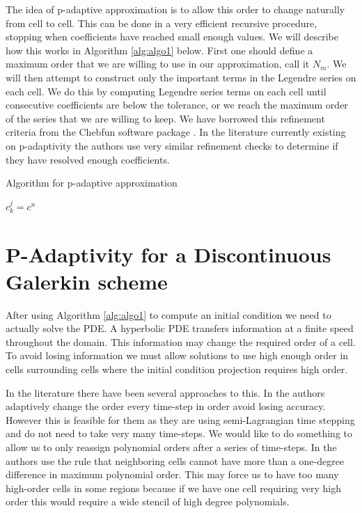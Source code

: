 \documentclass[10]{amsart}
\begin{document}
The idea of p-adaptive approximation is to allow this order to change naturally from cell to cell. This can be done in a 
very efficient recursive procedure, stopping when coefficients have reached small enough values. 
We will describe how this works in Algorithm \ref{alg:algo1} below.
First one should define a maximum order that we are willing to use in our approximation, call it $N_m$. We will
then attempt to construct only the important terms in the Legendre series on each cell. We do this by computing Legendre
series terms on each cell until consecutive coefficients are below the tolerance, or we reach the maximum order
of the series that we are willing to keep. We have borrowed this refinement criteria from the Chebfun software package
\cite{trefethen2013approximation}.
In the literature currently existing on p-adaptivity\cite{tumolo2013semi,eskilsson2011hp} the authors use very similar
refinement checks to determine if they have resolved enough coefficients. 

\begin{algorithm}
\caption{Algorithm for p-adaptive approximation}
\begin{algorithmic}[1]
    \State $c^j_k=c^n$
  \EndWhile
\EndFor
\end{algorithmic}\label{alg:algo1}
\end{algorithm}

\section{P-Adaptivity for a Discontinuous Galerkin scheme}

After using Algorithm \ref{alg:algo1} to
compute an initial condition we need to actually solve the PDE. A hyperbolic PDE transfers information at a finite
speed throughout the domain. This information may change the required order of a cell. To avoid losing information we
must allow solutions to use high enough order in cells surrounding cells where the initial condition projection requires high
order. 

In the literature there have been several approaches to this. In \cite{tumolo2013semi} the authors adaptively change
the order every time-step in order avoid losing accuracy. However this is feasible for them 
as they are using semi-Lagrangian time
stepping and do not need to take very many time-steps. We would like to do something to allow us to only reassign polynomial
orders after a series of time-steps. In \cite{eskilsson2011hp} the authors use the rule that neighboring cells
cannot have more than a one-degree difference in maximum polynomial order. This may force us to have
too many high-order cells in some regions because if we have one cell requiring very high order this would require
a wide stencil of high degree polynomials.
\end{document}
